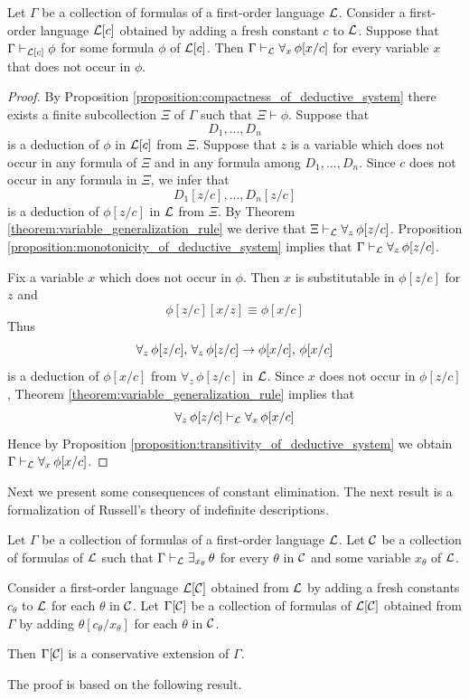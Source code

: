 \documentclass[10pt]{amsart}
\begin{document}
\begin{theorem}\label{theorem:constant_elimination_rule}
	Let $\Gamma$ be a collection of formulas of a first-order language ${\mathcal L}$. Consider a first-order language ${\mathcal L}[c]$ obtained by adding a fresh constant $c$ to ${\mathcal L}$. Suppose that $\Gamma \vdash_{{\mathcal L}[c]} \phi$ for some formula $\phi$ of ${\mathcal L}[c]$. Then $\Gamma \vdash_{{\mathcal L}} \forall_x\,\phi[x/c]$ for every variable $x$ that does not occur in $\phi$.
\end{theorem}
\begin{proof}
	By Proposition \ref{proposition:compactness_of_deductive_system} there exists a finite subcollection $\Xi$ of $\Gamma$ such that $\Xi \vdash \phi$. Suppose that
	$$D_1,...,D_n$$
	is a deduction of $\phi$ in ${\mathcal L}[c]$ from $\Xi$. Suppose that $z$ is a variable which does not occur in any formula of $\Xi$ and in any formula among $D_1,...,D_n$. Since $c$ does not occur in any formula in $\Xi$, we infer that
	$$D_1[z/c],...,D_n[z/c]$$
	is a deduction of $\phi[z/c]$ in ${\mathcal L}$ from $\Xi$. By Theorem \ref{theorem:variable_generalization_rule} we derive that $\Xi \vdash_{{\mathcal L}} \forall_z\,\phi[z/c]$. Proposition \ref{proposition:monotonicity_of_deductive_system} implies that $\Gamma \vdash_{{\mathcal L}} \forall_z\,\phi[z/c]$.

	Fix a variable $x$ which does not occur in $\phi$. Then $x$ is substitutable in $\phi[z/c]$ for $z$ and
	$$\phi[z/c][x/z] \equiv \phi[x/c]$$
	Thus
	$$\forall_z\,\phi[z/c],\,\forall_z\,\phi[z/c] \rightarrow \phi[x/c],\,\phi[x/c]$$
	is a deduction of $\phi[x/c]$ from $\forall_z\,\phi[z/c]$ in ${\mathcal L}$. Since $x$ does not occur in $\phi[z/c]$, Theorem \ref{theorem:variable_generalization_rule} implies that
	$$\forall_z\,\phi[z/c]\vdash_{{\mathcal L}} \forall_x\,\phi[x/c]$$
	Hence by Proposition \ref{proposition:transitivity_of_deductive_system} we obtain $\Gamma \vdash_{{\mathcal L}} \forall_x\,\phi[x/c]$.
\end{proof}
Next we present some consequences of constant elimination. The next result is a formalization of Russell's theory of indefinite descriptions.

\begin{theorem}\label{theorem:extension_by_indefinite_descriptions_for_individuals_is_conservative}
  Let $\Gamma$ be a collection of formulas of a first-order language ${\mathcal L}$. Let ${\mathcal C}$ be a collection of formulas of ${\mathcal L}$ such that $\Gamma \vdash_{{\mathcal L}} \exists_{x_{\theta}}\,\theta$ for every $\theta$ in ${\mathcal C}$ and some variable $x_{\theta}$ of ${\mathcal L}$. 

  Consider a first-order language ${\mathcal L}[{\mathcal C}]$ obtained from ${\mathcal L}$ by adding a fresh constants $c_{\theta}$ to ${\mathcal L}$ for each $\theta$ in ${\mathcal C}$. Let $\Gamma[{\mathcal C}]$ be a collection of formulas of ${\mathcal L}[{\mathcal C}]$ obtained from $\Gamma$ by adding $\theta[c_{\theta}/x_{\theta}]$ for each $\theta$ in ${\mathcal C}$. 

  Then $\Gamma[{\mathcal C}]$ is a conservative extension of $\Gamma$.
\end{theorem}
\noindent
The proof is based on the following result.
\end{document}
